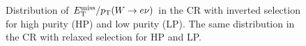 \begin{figure}[h!tb]
\caption[Distribution of $\MET/\pT(W\ra e\nu)$ in the \Wjets control region with inverted and relaxed \MET cuts. ]{Distribution of $\MET/\pT(W\ra e\nu)$ in the \Wjets CR with inverted \MET selection for \protect{} high purity (HP) and  \protect{} low purity (LP). The same distribution in the \Wjets CR with relaxed \MET selection for \protect{} HP and \protect{} LP. }
\label{fig:qcd_reg}
\end{figure}

